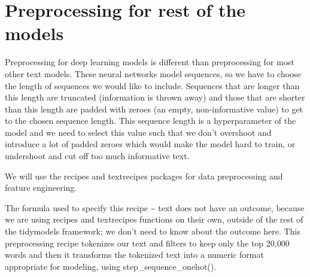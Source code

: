 \documentclass[
]{article}
\begin{document}
\hypertarget{preprocessing-for-rest-of-the-models}{%
\section{Preprocessing for rest of the
models}\label{preprocessing-for-rest-of-the-models}}

Preprocessing for deep learning models is different than preprocessing
for most other text models. These neural networks model sequences, so we
have to choose the length of sequences we would like to include.
Sequences that are longer than this length are truncated (information is
thrown away) and those that are shorter than this length are padded with
zeroes (an empty, non-informative value) to get to the chosen sequence
length. This sequence length is a hyperparameter of the model and we
need to select this value such that we don't overshoot and introduce a
lot of padded zeroes which would make the model hard to train, or
undershoot and cut off too much informative text.

We will use the recipes and textrecipes packages for data preprocessing
and feature engineering.

The formula used to specify this recipe \textasciitilde{} text does not
have an outcome, because we are using recipes and textrecipes functions
on their own, outside of the rest of the tidymodels framework; we don't
need to know about the outcome here. This preprocessing recipe tokenizes
our text and filters to keep only the top 20,000 words and then it
transforms the tokenized text into a numeric format appropriate for
modeling, using step\_sequence\_onehot().
\end{document}
